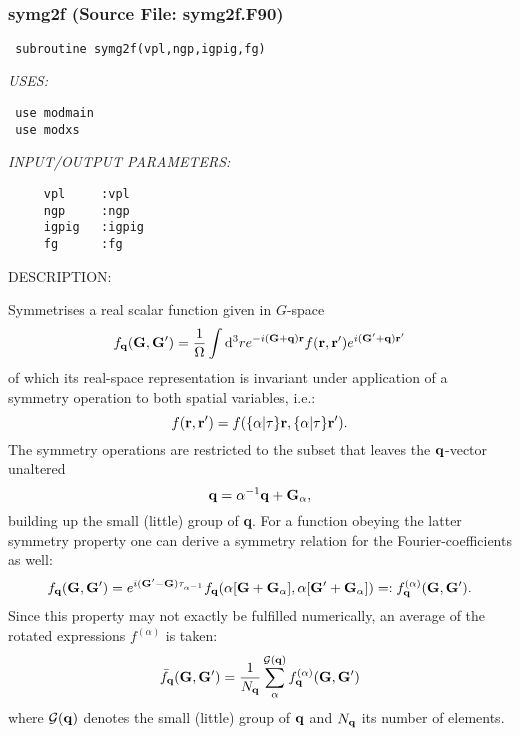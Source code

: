 \documentclass[11pt]{article}
\begin{document}











 
 
\mbox{}\hrulefill\ 
 
\subsubsection{symg2f (Source File: symg2f.F90)}


\begin{verbatim} subroutine symg2f(vpl,ngp,igpig,fg)\end{verbatim}{\em USES:}
\begin{verbatim} use modmain
 use modxs
 \end{verbatim}{\em INPUT/OUTPUT PARAMETERS:}
\begin{verbatim}     vpl     :vpl
     ngp     :ngp
     igpig   :igpig
     fg      :fg\end{verbatim}
{\sf DESCRIPTION:\\ }


     Symmetrises a real scalar function given in $G$-space
     $$ f_{\bf q}({\bf G},{\bf G'}) = \frac{1}{\Omega}\int {\rm d}^3r 
     e^{-i{\bf (G+q)r}} f({\bf r},{\bf r'}) e^{i{\bf (G'}+{\bf q}){\bf r'}} $$
     of which its real-space representation is invariant under application of
     a symmetry  operation to both spatial variables, i.e.:
     $$ f({\bf r},{\bf r'}) = f(\{\alpha|\tau\}{\bf r},\{\alpha|\tau\}{\bf r'}).
     $$
     The symmetry operations are restricted to the subset that leaves the
     ${\bf q}$-vector unaltered
     $$ {\bf q}=\alpha^{-1}{\bf q} + {\bf G}_{\alpha},  $$
     building up the small (little) group of {\bf q}.
     For a function obeying the latter symmetry property one can derive a
     symmetry relation for the Fourier-coefficients as well:
     $$ f_{\bf q}({\bf G},{\bf G'}) =  
     e^{i({\bf G'}-{\bf G})\tau_{\alpha^{-1}}} 
     f_{\bf q}(\alpha[{\bf G}+{\bf G}_{\alpha}],
     \alpha[{\bf G'}+{\bf G}_{\alpha}]) =: f^{(\alpha)}_{\bf q}({\bf G},
     {\bf G'}).$$
     Since this property may not exactly be fulfilled numerically, an average
     of the rotated expressions $f^{(\alpha)}$ is taken:
     $$  \bar{f}_{\bf q}({\bf G},{\bf G'})= \frac{1}{N_{\bf q}}
     \sum_{\alpha}^{\mathcal{G}({\bf q})}
     f^{(\alpha)}_{\bf q}({\bf G},{\bf G'}) $$
     where $\mathcal{G}({\bf q})$ denotes the small (little) group of ${\bf q}$
     and $N_{\bf q}$ its number of elements.
  
\end{document}
